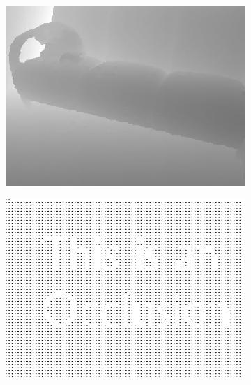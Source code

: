 \documentclass[preprint,10pt,5p,times,twocolumn]{elsarticle}
\begin{document}
\begin{figure}[t]
\begin{center}
\begin{subfigure}[b]{0.136\linewidth}
    \includegraphics[width=\linewidth]{sofa_random_missing_inpainting.png}
\end{subfigure}
\begin{subfigure}[b]{0.136\linewidth}
    \includegraphics[width=\linewidth]{sofa_upsampling_depth.png}
\end{subfigure}
\begin{subfigure}[b]{0.136\linewidth}

\end{subfigure}
\end{center}
\end{figure}
\end{document}
